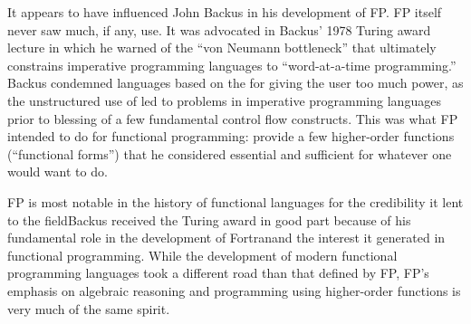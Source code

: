 It appears to have influenced John Backus in his development of FP. FP itself never saw much, if any, use. It was advocated in Backus' 1978 Turing award lecture in which he warned of the ``von Neumann bottleneck'' that ultimately constrains imperative programming languages to ``word-at-a-time programming.'' %
Backus condemned languages based on the \lambdacalc for giving the user too much power, as the unstructured use of  led to problems in imperative programming languages prior to blessing of a few fundamental control flow constructs. This was what FP intended to do for functional programming: provide a few higher-order functions (``functional forms'') that he considered essential and sufficient for whatever one would want to do.

FP is most notable in the history of functional languages for the credibility it lent to the field\empause Backus received the Turing award in good part because of his fundamental role in the development of Fortran\empause and the interest it generated in functional programming. While the development of modern functional programming languages took a different road than that defined by FP, FP's emphasis on algebraic reasoning and programming using higher-order functions is very much of the same spirit.